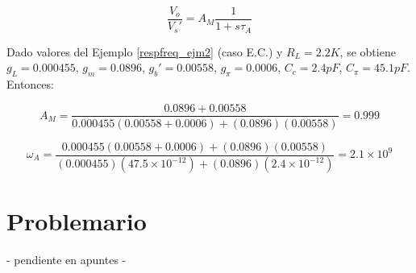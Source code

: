 \[ \frac{V_o}{V_s'} = A_M \frac{1}{1 + s \tau_A} \]

Dado valores del Ejemplo \ref{respfreq_ejm2} (caso E.C.) y \( R_L = 2.2K \), se obtiene \( g_L = 0.000455 \), \( g_m = 0.0896 \), \( g_b' = 0.00558 \), \( g_\pi = 0.0006 \), \( C_c = 2.4 pF \), \( C_\pi = 45.1 pF \). Entonces:

\[ A_M = \frac{0.0896 + 0.00558}{0.000455 (0.00558 + 0.0006) + (0.0896) (0.00558)} = 0.999 \]

\[ \omega_A = \frac{0.000455 (0.00558 + 0.0006) + (0.0896) (0.00558)}{(0.000455) (47.5 \times 10^{-12}) + (0.0896) (2.4 \times 10^{-12})} = 2.1 \times 10^9 \]

\section{Problemario} %
- pendiente en apuntes -